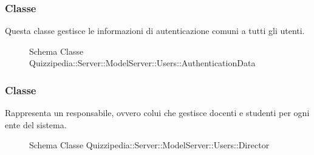 \subsubsection{Classe }
Questa classe gestisce le informazioni di autenticazione comuni a tutti gli utenti.
\begin{figure}[H]
\centering
\noindent{}
\caption[Schema Classe AuthenticationData]{Schema Classe Quizzipedia::Server::ModelServer::Users::AuthenticationData}
\end{figure}
\subsubsection{Classe }
Rappresenta un responsabile, ovvero colui che gestisce docenti e studenti per ogni ente del sistema.
\begin{figure}[H]
\centering
\noindent{}
\caption[Schema Classe Director]{Schema Classe Quizzipedia::Server::ModelServer::Users::Director}
\end{figure}
